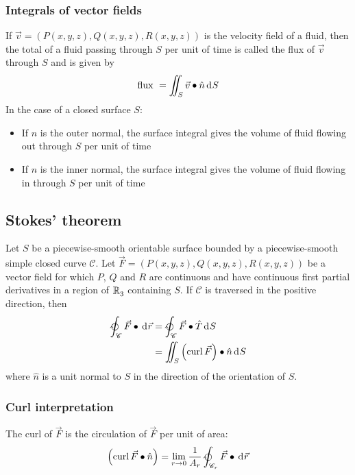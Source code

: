 \documentclass[10pt, twocolumn]{article}
\theoremstyle{remark}
\begin{document}
\subsubsection*{Integrals of vector fields}
If \(\vec{v} = (P(x, y, z), Q(x, y, z), R(x, y, z))\) is the velocity field of a fluid, then the total of a fluid passing through \(S\) per unit of time is called the flux of \(\vec{v}\) through \(S\) and is given by
\[
  \text{flux } = \iint_S {\vec{v} \bullet \hat{n}\,\mathrm{d}^{} S}
\]
In the case of a closed surface \(S\):
\begin{itemize}
  \item If \(\hat{n}\) is the outer normal, the surface integral gives the volume of fluid flowing out through \(S\) per unit of time
  \item If \(\hat{n}\) is the inner normal, the surface integral gives the volume of fluid flowing in through \(S\) per unit of time
\end{itemize}

\subsection{Stokes' theorem}
Let \(S\) be a piecewise-smooth orientable surface bounded by a piecewise-smooth simple closed curve \(\mathscr{C}\).
Let \(\vec{F} = (P(x, y, z), Q(x, y, z), R(x, y, z))\) be a vector field for which \(P\), \(Q\) and \(R\) are continuous and have continuous first partial derivatives in a region of \(\mathbb{R}_{3}^{}\) containing \(S\).
If \(\mathscr{C}\) is traversed in the positive direction, then
\begin{align*}
  \ointclockwise_{\mathscr{C}}{\vec{F} \bullet \diffint{\vec{r}}} & = \ointclockwise_{\mathscr{C}}{\vec{F} \bullet \hat{T}\diffint{S}} \\
                                                                  & = \iint_S {\left( \curl{F} \right) \bullet \hat{n}\diffint{S}}
\end{align*}
where \(\hat{n}\) is a unit normal to \(S\) in the direction of the orientation of \(S\).

\subsubsection*{Curl interpretation}
The curl of \(\vec{F}\) is the circulation of \(\vec{F}\) per unit of area:
\[
  \left( \curl{F} \bullet \hat{n} \right) = \limit{r}{0}{\frac{1}{A_r }\ointclockwise_{\mathscr{C}_r }{\vec{F} \bullet \diffint{\vec{r}}}}
\]
\end{document}
